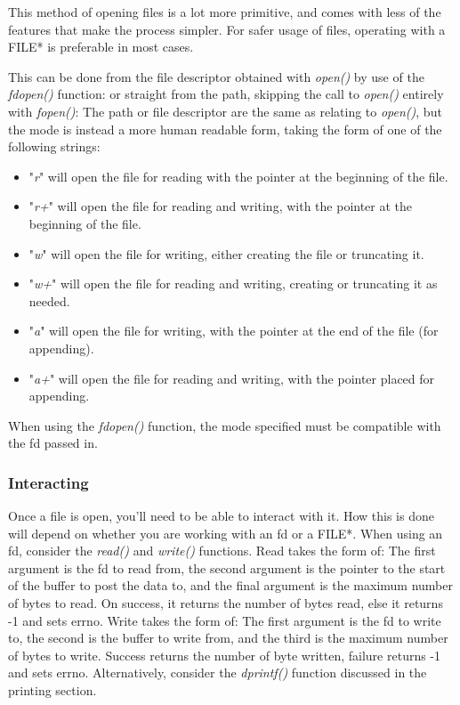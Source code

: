 \documentclass{article}
\begin{document}
This method of opening files is a lot more primitive, and comes with less of the features that make the process simpler. For safer usage of files, operating with a FILE* is preferable in most cases.

This can be done from the file descriptor obtained with \textit{open()} by use of the \textit{fdopen()} function:
or straight from the path, skipping the call to \textit{open()} entirely with \textit{fopen()}:
The path or file descriptor are the same as relating to \textit{open()}, but the mode is instead a more human readable form, taking the form of one of the following strings:
\begin{itemize}
    \item "\textit{r}" will open the file for reading with the pointer at the beginning of the file.
    \item "\textit{r+}" will open the file for reading and writing, with the pointer at the beginning of the file.
    \item "\textit{w}" will open the file for writing, either creating the file or truncating it.
    \item "\textit{w+}" will open the file for reading and writing, creating or truncating it as needed.
    \item "\textit{a}" will open the file for writing, with the pointer at the end of the file (for appending).
    \item "\textit{a+}" will open the file for reading and writing, with the pointer placed for appending.
\end{itemize}
When using the \textit{fdopen()} function, the mode specified must be compatible with the fd passed in.

\subsubsection{Interacting}
Once a file is open, you'll need to be able to interact with it. How this is done will depend on whether you are working with an fd or a FILE*. When using an fd, consider the \textit{read()} and \textit{write()} functions. Read takes the form of:
The first argument is the fd to read from, the second argument is the pointer to the start of the buffer to post the data to, and the final argument is the maximum number of bytes to read. On success, it returns the number of bytes read, else it returns -1 and sets errno. Write takes the form of:
The first argument is the fd to write to, the second is the buffer to write from, and the third is the maximum number of bytes to write. Success returns the number of byte written, failure returns -1 and sets errno. Alternatively, consider the \textit{dprintf()} function discussed in the printing section.
\end{document}
